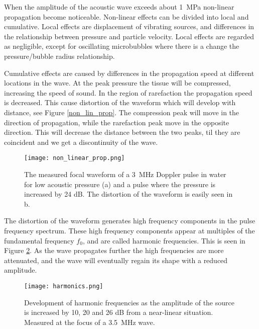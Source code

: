 When the amplitude of the acoustic wave exceeds about \SI{1}{\mega\pascal} non-linear propagation become noticeable\cite{Uck2002}. Non-linear effects can be divided into local and cumulative. Local effects are displacement of vibrating sources, and differences in the relationship between pressure and particle velocity. Local effects are regarded as negligible, except for oscillating microbubbles where there is a change the pressure/bubble radius relationship\cite{Uck2002}. 

Cumulative effects are caused by differences in the propagation speed at different locations in the wave. At the peak pressure the tissue will be compressed, increasing the speed of sound. In the region of rarefaction the propagation speed is decreased.  This cause distortion of the waveform which will develop with distance, see Figure \ref{non_lin_prop}. The compression peak will move in the direction of propagation, while the rarefaction peak move in the opposite direction. This will decrease the distance between the two peaks, til they are coincident and we get a discontinuity of the wave.  

\begin{figure}[h]
  \centering
  \label{Fig:non_lin_prop}
  \texttt{[image: non\_linear\_prop.png]}
  \caption{The measured focal waveform of a \SI{3}{\mega\hertz} Doppler pulse in water for low acoustic pressure (a) and a pulse where the pressure is increased by 24 dB. The distortion of the waveform is easily seen in b\cite{Uck2002}.}
\end{figure} 

The distortion of the waveform generates high frequency components in the pulse frequency spectrum. These high frequency components appear at multiples of the fundamental frequency $f_0$, and are called harmonic frequencies. This is seen in Figure \ref{Fig:harmonics}. As the wave propagates further the high frequencies are more attenuated, and the wave will eventually regain its shape with a reduced amplitude. 

\begin{figure}[h]
  \centering
  \label{Fig:harmonics}
  \texttt{[image: harmonics.png]}
  \caption{Development of harmonic frequencies as the amplitude of the source is increased by 10, 20 and 26 dB from a near-linear situation. Measured at the focus of a \SI{3.5}{\mega\hertz} wave\cite{Uck2002}.}
\end{figure} 



